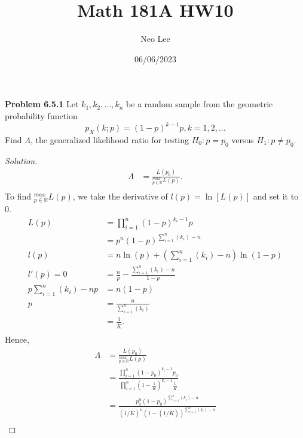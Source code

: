 \documentclass{article}
\title{Math 181A HW10}
\author{Neo Lee}
\date{06/06/2023}
\begin{document}
 

\maketitle 

\textbf{Problem 6.5.1}
Let $k_1, k_2, \dots, k_n$ be a random sample from the geometric probability function
$$p_X(k;p)=(1-p)^{k-1}p, k=1,2,\dots$$
Find $\Lambda$, the generalized likelihood ratio for testing $H_0: p = p_0$ versus $H_1: p  \neq p_0$.
\begin{proof}[Solution]
    \begin{align*}
        \Lambda & = \frac{L(p_0)}{^{max}_{p \in \mathbb{R}}L(p)}. \\
    \end{align*}
    To find $^{max}_{p\in\mathbb{R}}L(p)$, we take the derivative of $l(p) = \ln[L(p)]$ and set it to 0.
    \begin{align*}
        L(p) & = \prod_{i=1}^{n}(1-p)^{k_i-1}p \\
        & = p^n(1-p)^{\sum\limits_{i=1}^{n}(k_i)-n} \\
        l(p) & = n\ln(p) + \left(\sum\limits_{i=1}^{n}(k_i)-n\right)\ln(1-p) \\
        l'(p) = 0 & = \frac{n}{p} - \frac{\sum\limits_{i=1}^{n}(k_i)-n}{1-p} \\
        p\sum_{i=1}^{n}(k_i) - np & = n(1-p) \\
        p & = \frac{n}{\sum_{i=1}^{n}(k_i)} \\
        & = \frac{1}{\overline{K}}. \\
    \end{align*}
    Hence,
    \begin{align*}
        \Lambda & = \frac{L(p_0)}{^{max}_{p \in \mathbb{R}}L(p)} \\
        & = \frac{\prod\limits_{i=1}^{n}(1-p_0)^{k_i-1}p_0}{\prod\limits_{i=1}^{n}(1-\frac{1}{\overline{K}})^{k_i-1}\frac{1}{\overline{K}}} \\
        & = \frac{p_0^n(1-p_0)^{\sum_{i=1}^{n}(k_i)-n}}{(1/\overline{K})^n(1-(1/\overline{K}))^{\sum_{i=1}^{n}(k_i)-n}} \\
    \end{align*}
\end{proof}
\bigbreak
\end{document}

